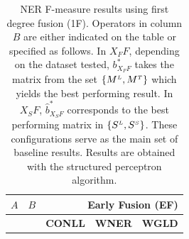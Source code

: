 \begin{table}[!t]
\centering
\setlength\tabcolsep{2pt}

\caption{NER F-measure results using first degree fusion (1F). Operators in column $B$ are either indicated on the table or specified as follows. In $X_FF$, depending on the dataset tested,  ${b}^*_{\scriptscriptstyle X_FF}$ takes the matrix from the set $\{M^{\scriptscriptstyle L}, M^{\scriptscriptstyle T}\}$ which yields the best performing result. In $X_SF$, $\hat{b}_{\scriptscriptstyle X_SF}^{*}$ corresponds to the best performing matrix in $\{S^{\scriptscriptstyle L},S^{\scriptscriptstyle S}\}$. These configurations serve as the main set of baseline results. Results are obtained with the structured perceptron algorithm.}
\label{tab:ner-1d}
\centering
\begin{tabular}{@{}llccc@{}}
\toprule
    $A$      &    $B$       & \multicolumn{3}{r}{\textbf{Early Fusion (EF)} }                                            \\ \midrule
          &           & \textbf{CONLL}                      & \textbf{WNER}                      & \textbf{WGLD}                      \\ \cmidrule{3-5}
          

\end{tabular}
\end{table}

